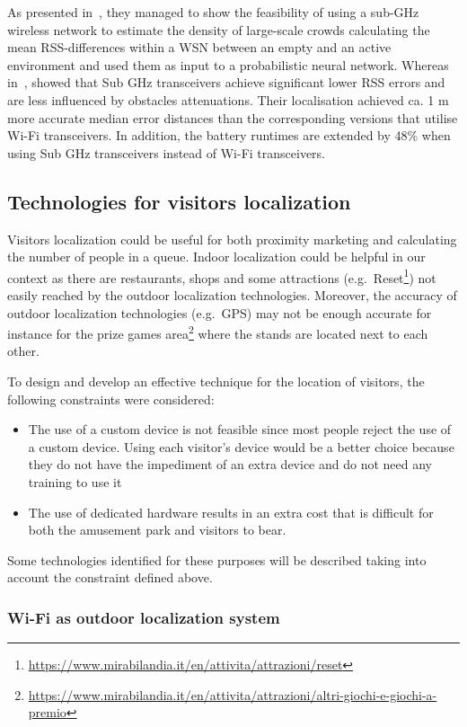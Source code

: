 As presented in~\cite{denis2018large}, they managed to show the feasibility of using a sub-GHz wireless network to estimate the density of
large-scale crowds calculating the mean RSS-differences within a WSN between an empty and an active environment and used them as input to a
probabilistic neural network. Whereas in~\cite{fudickar2014comparing}, showed that Sub GHz transceivers achieve significant lower RSS errors and are
less influenced by obstacles attenuations. Their localisation achieved ca. 1 m more accurate median error distances than the corresponding versions
that utilise Wi-Fi transceivers. In addition, the battery runtimes are extended by 48\% when using Sub GHz transceivers instead of Wi-Fi
transceivers.

\subsection{Technologies for visitors localization}\label{sec:technologies}
Visitors localization could be useful for both proximity marketing and calculating the number of people in a queue. Indoor localization could be
helpful in our context as there are restaurants, shops and some attractions (e.g.\
Reset\footnote{\url{https://www.mirabilandia.it/en/attivita/attrazioni/reset}}) not easily reached by the outdoor localization technologies.
Moreover, the accuracy of outdoor localization technologies (e.g.\ GPS) may not be enough accurate for instance for the prize games
area\footnote{\url{https://www.mirabilandia.it/en/attivita/attrazioni/altri-giochi-e-giochi-a-premio}} where the stands are located next to each
other.

To design and develop an effective technique for the location of visitors, the following constraints were considered:
\begin{itemize}
	\item The use of a custom device is not feasible since most people reject the use of a custom device. Using each visitor's device would be a better choice
	      because they do not have the impediment of an extra device and do not need any training to use it
	\item The use of dedicated hardware results in an extra cost that is difficult for both the amusement park and visitors to bear.
\end{itemize}

Some technologies identified for these purposes will be described taking into account the constraint defined above.

\subsubsection{Wi-Fi as outdoor localization system}\label{subsec:wi-fi-as-outdoor-localization-system}

